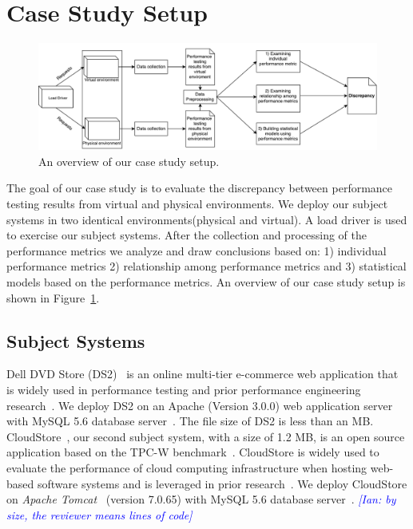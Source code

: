 \documentclass[smallextended]{svjour3}       %
\newcommand{\ian}[1]{\textcolor{blue}{{\it [Ian: #1]}}}
\begin{document}
\section{Case Study Setup}
\label{sec:case}

\begin{figure}[thb]
	\includegraphics[width=.9\textwidth]{overview}
	\caption{An overview of our case study setup.}
	\label{fig:Approach}
\end{figure}

The goal of our case study is to evaluate the discrepancy between performance testing results from virtual and physical environments. We deploy our subject systems in two identical environments(physical and virtual). A load driver is used to exercise our subject systems. After the collection and processing of the performance metrics we analyze and draw conclusions based on: 1) individual performance metrics 2) relationship among performance metrics and 3) statistical models based on the performance metrics. An overview of our case study setup is shown in Figure~\ref{fig:Approach}.


\subsection{Subject Systems}
Dell DVD Store (DS2)~\cite{delldvd} is an online multi-tier e-commerce web application that is widely used in performance testing and prior performance engineering research~\cite{Shang:2015:ADP:2668930.2688052,Nguyen:2012:ADP:2188286.2188344, jackicsm2009}. We deploy DS2 on an Apache (Version 3.0.0) web application server with MySQL 5.6 database server~\cite{mysql}. The file size of DS2 is less than an MB. CloudStore~\cite{cloudstore}, our second subject system, with a size of 1.2 MB, is an open source application based on the TPC-W benchmark~\cite{tpcw}. CloudStore is widely used to evaluate the performance of cloud computing infrastructure when hosting web-based software systems and is leveraged in prior research~\cite{tarekmsr16}. We deploy CloudStore on \textit{Apache Tomcat}~\cite{tomcat} (version 7.0.65) with MySQL 5.6 database server~\cite{mysql}. \ian{by size, the reviewer means lines of code}
\end{document}
